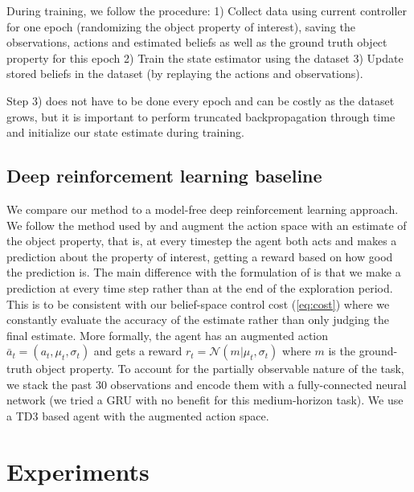 \documentclass[anon]{l4dc2024}
\begin{document}
During training, we follow the  procedure:
1) Collect data using current controller for one epoch (randomizing the object property of interest), saving the observations, actions and estimated beliefs as well as the ground truth object property for this epoch
2) Train the state estimator using the dataset
3) Update stored beliefs in the dataset (by replaying the actions and observations).

Step 3) does not have to be done every epoch and can be costly as the dataset grows, but it is important to perform truncated backpropagation through time and initialize our state estimate during training.

\subsection{Deep reinforcement learning baseline}
\label{sec:baseline}
We compare our method to a model-free deep reinforcement learning approach.
We follow the method used by \citet{denil2016learning} and augment the action space with an estimate of the object property, that is, at every timestep the agent both acts and makes a prediction about the property of interest, getting a reward based on how good the prediction is.
The main difference with the formulation of \citet{denil2016learning} is that we make a prediction at every time step rather than  at the end of the exploration period. This is to be consistent with our belief-space control cost (\autoref{eq:cost}) where we constantly evaluate the accuracy of the estimate rather than only judging the final estimate.
More formally, the agent has an augmented action $\bar{a}_t = (a_t, \mu_t, \sigma_t)$ and gets a reward $r_t = \mathcal{N}(m|\mu_t, \sigma_t)$ where $m$ is the ground-truth object property.
To account for the partially observable nature of the task, we stack the past $30$ observations and encode them with a fully-connected neural network (we tried a \ac{GRU} \citep{cho2014properties} with no benefit for this medium-horizon task).
We use a TD3 \citep{td3} based agent with the augmented action space.

\section{Experiments}
\label{sec:experiments}
\end{document}
